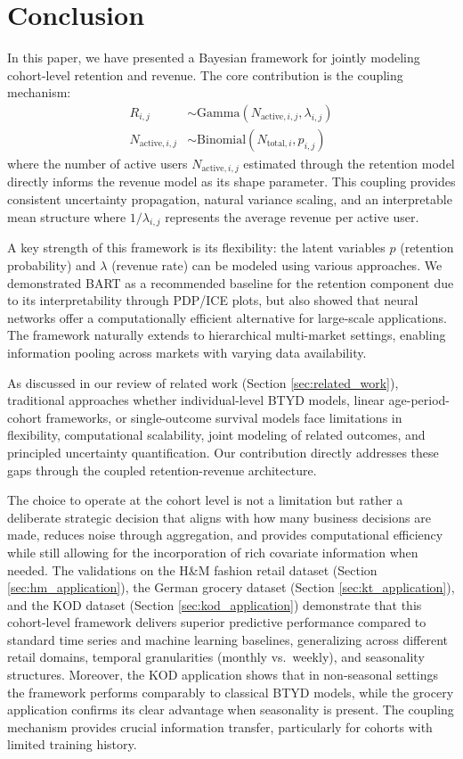 \documentclass[11pt]{amsart}
\theoremstyle{definition}
\begin{document}
\section{Conclusion}\label{sec:conclusion}

In this paper, we have presented a Bayesian framework for jointly modeling cohort-level retention and revenue. The core 
contribution is the coupling mechanism:
\begin{align*}
    R_{i,j}         & \sim \text{Gamma}(N_{\text{active}, i,j}, \lambda_{i,j}) \\
    N_{\text{active}, i,j} & \sim \text{Binomial}(N_{\text{total}, i}, p_{i,j})
\end{align*}
where the number of active users $N_{\text{active}, i,j}$ estimated through the retention model directly informs the revenue 
model as its shape parameter. This coupling provides consistent uncertainty propagation, natural variance scaling, and 
an interpretable mean structure where $1/\lambda_{i,j}$ represents the average revenue per active user.

A key strength of this framework is its flexibility: the latent variables $p$ (retention probability) and $\lambda$ 
(revenue rate) can be modeled using various approaches. We demonstrated BART as a recommended baseline for the retention 
component due to its interpretability through PDP/ICE plots, but also showed that neural networks offer a 
computationally efficient alternative for large-scale applications. The framework naturally extends to hierarchical 
multi-market settings, enabling information pooling across markets with varying data availability.

As discussed in our review of related work (Section \ref{sec:related_work}), traditional approaches whether individual-level 
BTYD models, linear age-period-cohort frameworks, or single-outcome survival models face limitations in flexibility, 
computational scalability, joint modeling of related outcomes, and principled uncertainty quantification. Our contribution 
directly addresses these gaps through the coupled retention-revenue architecture.

The choice to operate at the cohort level is not a limitation but rather a deliberate strategic decision that aligns with 
how many business decisions are made, reduces noise through aggregation, and provides computational efficiency while still 
allowing for the incorporation of rich covariate information when needed. The validations on the H\&M fashion retail dataset 
(Section \ref{sec:hm_application}), the German grocery dataset (Section \ref{sec:kt_application}), and the KOD dataset 
(Section \ref{sec:kod_application}) demonstrate that this cohort-level framework delivers superior predictive performance 
compared to standard time series and machine learning baselines, generalizing across different retail domains, temporal 
granularities (monthly vs.\ weekly), and seasonality structures. Moreover, the KOD application shows that in non-seasonal 
settings the framework performs comparably to classical BTYD models, while the grocery application confirms its clear 
advantage when seasonality is present. The coupling mechanism provides crucial information transfer, particularly for 
cohorts with limited training history.
\end{document}
